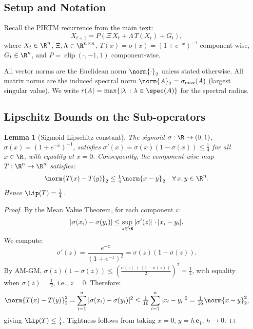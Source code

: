 \documentclass[11pt,letterpaper]{article}
\newtheorem{lemma}[theorem]{Lemma}
\theoremstyle{remark}
\begin{document}
\subsection{Setup and Notation}

Recall the PIRTM recurrence from the main text:
\begin{equation}
  X_{t+1} = P\!\left(\Xi\, X_t + \Lambda\, T(X_t) + G_t\right),
  \label{eq:A-recurrence}
\end{equation}
where $X_t \in \R^n$, $\Xi, \Lambda \in \R^{n \times n}$,
$T(x) = \sigma(x) = (1+e^{-x})^{-1}$ component-wise,
$G_t \in \R^n$, and $P = \operatorname{clip}(\cdot,-1,1)$ component-wise.

All vector norms are the Euclidean norm $\norm{\cdot}_2$ unless stated
otherwise. All matrix norms are the induced spectral norm
$\norm{A}_2 = \sigma_{\max}(A)$ (largest singular value).
We write $r(A) = \max\{|\lambda| : \lambda \in \spec(A)\}$ for the
spectral radius.

\subsection{Lipschitz Bounds on the Sub-operators}

\begin{lemma}[Sigmoid Lipschitz constant]
\label{lem:sigmoid-lip}
The sigmoid $\sigma : \R \to (0,1)$, $\sigma(x) = (1+e^{-x})^{-1}$,
satisfies $\sigma'(x) = \sigma(x)(1-\sigma(x)) \leq \tfrac{1}{4}$
for all $x \in \R$, with equality at $x = 0$.
Consequently, the component-wise map $T : \R^n \to \R^n$
satisfies:
\[
  \norm{T(x) - T(y)}_2 \leq \tfrac{1}{4}\norm{x-y}_2
  \quad \forall\, x, y \in \R^n.
\]
Hence $\Lip(T) = \tfrac{1}{4}$.
\end{lemma}

\begin{proof}
By the Mean Value Theorem, for each component $i$:
\[
  |\sigma(x_i) - \sigma(y_i)| \leq \sup_{z \in \R} |\sigma'(z)| \cdot |x_i - y_i|.
\]
We compute:
\[
  \sigma'(z) = \frac{e^{-z}}{(1+e^{-z})^2} = \sigma(z)(1-\sigma(z)).
\]
By AM-GM, $\sigma(z)(1-\sigma(z)) \leq \left(\frac{\sigma(z)+(1-\sigma(z))}{2}\right)^2 = \frac{1}{4}$,
with equality when $\sigma(z) = \tfrac{1}{2}$, i.e., $z = 0$.
Therefore:
\[
  \norm{T(x)-T(y)}_2^2 = \sum_{i=1}^n |\sigma(x_i)-\sigma(y_i)|^2
  \leq \tfrac{1}{16}\sum_{i=1}^n |x_i-y_i|^2 = \tfrac{1}{16}\norm{x-y}_2^2,
\]
giving $\Lip(T) \leq \tfrac{1}{4}$.
Tightness follows from taking $x = 0$, $y = h\,\mathbf{e}_1$, $h \to 0$.
\end{proof}
\end{document}
